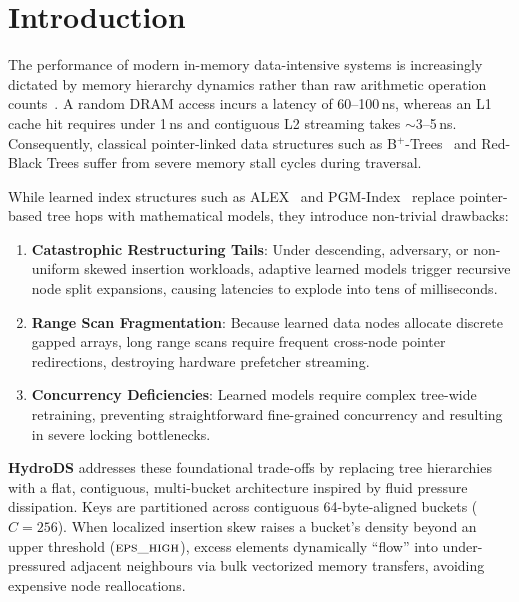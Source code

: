 \documentclass[10pt,twocolumn,letterpaper]{article}
\theoremstyle{definition}
\newcommand{\epsh}{\textsc{eps\_high}}
\begin{document}
\section{Introduction}
\label{sec:intro}

The performance of modern in-memory data-intensive systems is increasingly dictated by memory hierarchy dynamics rather than raw arithmetic operation counts~\cite{rao2000csb,patterson2020cod}. A random DRAM access incurs a latency of 60--100\,ns, whereas an L1 cache hit requires under 1\,ns and contiguous L2 streaming takes $\sim$3--5\,ns. Consequently, classical pointer-linked data structures such as B$^+$-Trees~\cite{bayer1972,graefe2011} and Red-Black Trees suffer from severe memory stall cycles during traversal.

While learned index structures such as ALEX~\cite{ding2020alex} and PGM-Index~\cite{ferragina2020pgm} replace pointer-based tree hops with mathematical models, they introduce non-trivial drawbacks:
\begin{enumerate}[label=(\roman*)]
  \item \textbf{Catastrophic Restructuring Tails}: Under descending, adversary, or non-uniform skewed insertion workloads, adaptive learned models trigger recursive node split expansions, causing latencies to explode into tens of milliseconds.
  \item \textbf{Range Scan Fragmentation}: Because learned data nodes allocate discrete gapped arrays, long range scans require frequent cross-node pointer redirections, destroying hardware prefetcher streaming.
  \item \textbf{Concurrency Deficiencies}: Learned models require complex tree-wide retraining, preventing straightforward fine-grained concurrency and resulting in severe locking bottlenecks.
\end{enumerate}

\textbf{HydroDS} addresses these foundational trade-offs by replacing tree hierarchies with a flat, contiguous, multi-bucket architecture inspired by fluid pressure dissipation. Keys are partitioned across contiguous 64-byte-aligned buckets ($C{=}256$). When localized insertion skew raises a bucket's density beyond an upper threshold ($\epsh$), excess elements dynamically ``flow'' into under-pressured adjacent neighbours via bulk vectorized memory transfers, avoiding expensive node reallocations.
\end{document}
